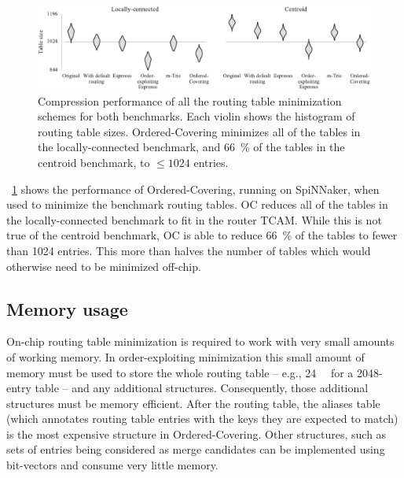 \documentclass[conference]{IEEEtran}
\begin{document}
\begin{figure}
  \centering
  \includegraphics{experiments/results_esp_and_oc}
  \caption{Compression performance of all the routing table minimization schemes for both benchmarks.
           Each violin shows the histogram of routing table sizes.
           Ordered-Covering minimizes all of the tables in the locally-connected benchmark, and
           \SI{66}{\percent} of the tables in the centroid benchmark, to $\le 1024$ entries.
           }
  \label{fig:results/final}
\end{figure}

  \figurename~\ref{fig:results/final} shows the performance of Ordered-Covering, running on SpiNNaker, when used to minimize the benchmark routing tables.
  OC reduces all of the tables in the locally-connected benchmark to fit in the router TCAM.
  While this is not true of the centroid benchmark, OC is able to reduce \SI{66}{\percent} of the tables to fewer than 1024 entries.
  This more than halves the number of tables which would otherwise need to be minimized off-chip.


  \subsection{Memory usage}


  On-chip routing table minimization is required to work with very small amounts of working memory.
  In order-exploiting minimization this small amount of memory must be used to store the whole routing table -- e.g., \SI{24}{\kibi\byte} for a 2048-entry table -- and any additional structures.
  Consequently, those additional structures must be memory efficient.
  After the routing table, the aliases table (which annotates routing table entries with the keys they are expected to match) is the most expensive structure in Ordered-Covering.
  Other structures, such as sets of entries being considered as merge candidates can be implemented using bit-vectors and consume very little memory.
\end{document}
